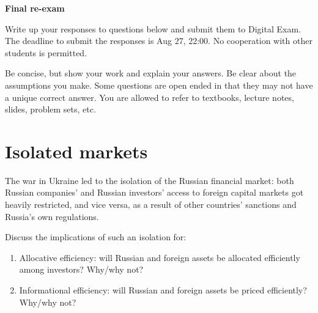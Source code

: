\documentclass[a4paper]{article}
\newif\ifsolutions
\begin{document}
{\ifsolutions \else	
	
\fi}

\begin{center}
		\LARGE\textbf{Final re-exam {\ifsolutions solutions \fi}}
\end{center}

{\ifsolutions \else	
Write up your responses to questions below and submit them to Digital Exam. The deadline to submit the responses is Aug 27, 22:00. No cooperation with other students is permitted.

Be concise, but show your work and explain your answers. Be clear about the assumptions you make. Some questions are open ended in that they may not have a unique correct answer. You are allowed to refer to textbooks, lecture notes, slides, problem sets, etc.
\fi}


\section{Isolated markets}
	The war in Ukraine led to the isolation of the Russian financial market: both Russian companies' and Russian investors' access to foreign capital markets got heavily restricted, and vice versa, as a result of other countries' sanctions and Russia's own regulations.
	
	Discuss the implications of such an isolation for:
	\begin{enumerate}
		\item Allocative efficiency: will Russian and foreign assets be allocated efficiently among investors? Why/why not?
		
		\item Informational efficiency: will Russian and foreign assets be priced efficiently? Why/why not?
	\end{enumerate}


\ifsolutions
\end{document}
